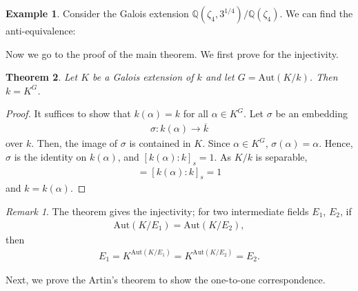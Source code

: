 \documentclass[12pt]{report}
\theoremstyle{plain}
\newtheorem{theorem}{Theorem}[section]
\theoremstyle{remark}
\newtheorem*{remark}{Remark}
\theoremstyle{definition}
\newtheorem{example}[theorem]{Example}
\newcommand{\Z}{\mathbb{Z}}
\newcommand{\Q}{\mathbb{Q}}
\begin{document}
\begin{example}
    Consider the Galois extension $\Q(\zeta_4,3^{1/4})/\Q(\zeta_4)$. We can find the anti-equivalence:
    \begin{figure}[H]
        \centering
    \end{figure}
\end{example}

Now we go to the proof of the main theorem. We first prove for the injectivity.

\begin{theorem}
    Let $K$ be a Galois extension of $k$ and let $G=\mathrm{Aut}(K/k)$. Then $k=K^G$.
\end{theorem}
\begin{proof}
    It suffices to show that $k(\alpha)=k$ for all $\alpha\in K^G$. Let $\sigma$ be an embedding
    \begin{align*}
        \sigma:k(\alpha)\rightarrow \overline{k}
    \end{align*}
    over $k$. Then, the image of $\sigma$ is contained in $K$. Since $\alpha\in K^G$, $\sigma(\alpha)=\alpha$. Hence, $\sigma$ is the identity on $k(\alpha)$, and $[k(\alpha):k]_s=1$. As $K/k$ is separable,
    \begin{align*}
        [k(\alpha):k]=[k(\alpha):k]_s=1
    \end{align*}
    and $k=k(\alpha)$.
\end{proof}
\begin{remark}
    The theorem gives the injectivity; for two intermediate fields $E_1$, $E_2$, if
    \begin{align*}
        \mathrm{Aut}(K/E_1)=\mathrm{Aut}(K/E_2),
    \end{align*}
    then
    \begin{align*}
        E_1=K^{\mathrm{Aut}(K/E_1)}=K^{\mathrm{Aut}(K/E_2)}=E_2.
    \end{align*}
\end{remark}

Next, we prove the Artin's theorem to show the one-to-one correspondence.
\end{document}
